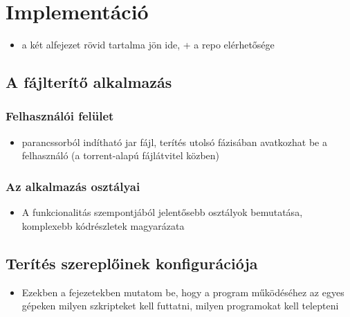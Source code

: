 \chapter{Implementáció}
\label{chp:implementation}
\begin{itemize}
  \item a két alfejezet rövid tartalma jön ide, + a repo elérhetősége
\end{itemize}
\cite{vmdistribution}

\section{A fájlterítő alkalmazás}

%
\subsection{Felhasználói felület}
%
\begin{itemize}
  \item parancssorból indítható jar fájl, terítés utolsó fázisában avatkozhat be a felhasználó (a torrent-alapú fájlátvitel közben)
\end{itemize}

%
\subsection{Az alkalmazás osztályai}
%



\begin{itemize}
  \item A funkcionalitás szempontjából jelentősebb osztályok bemutatása, komplexebb kódrészletek magyarázata
\end{itemize}

\section{Terítés szereplőinek konfigurációja}

\begin{itemize}
  \item Ezekben a fejezetekben mutatom be, hogy a program működéséhez az egyes gépeken milyen szkripteket kell futtatni, milyen programokat kell telepteni
\end{itemize}


